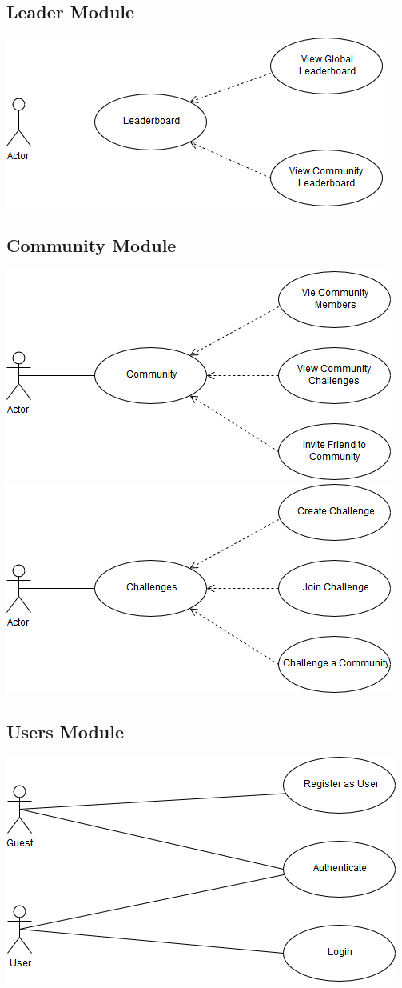 \documentclass[11pt]{article}
\begin{document}
\subsection{Leader Module}
\includegraphics[width=0.7\linewidth]{images/Leaderboard.png}\\[1cm]
\subsection{Community Module}
\includegraphics[width=0.7\linewidth]{images/Community1.png}\\[1cm]
\includegraphics[width=0.7\linewidth]{images/Community2.png}\\[1cm]
\subsection{Users Module}
\includegraphics[width=0.7\linewidth]{images/UserManagement.png}\\[1cm]
\end{document}
